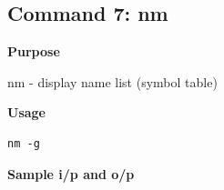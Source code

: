 \subsection{Command 7: nm} 
\textbf{Purpose}
\begin{flushleft}
       nm - display name list (symbol table)
\end{flushleft}
\textbf{Usage}
\begin{verbatim}
nm -g
\end{verbatim}
\textbf{Sample i/p and o/p}
\begin{figure}[H] 
\end{figure}

